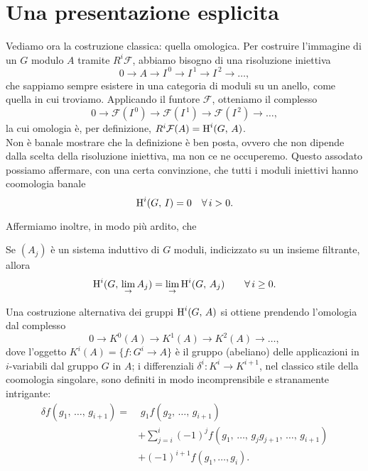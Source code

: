 \section{Una presentazione esplicita}

Vediamo ora la costruzione classica: quella omologica. Per costruire l'immagine di un $ G $ modulo $ A $ tramite $ R^i\mathcal{F} $, abbiamo bisogno di una risoluzione iniettiva
\[ 0 \to A \to I^{\,0} \to I^{\,1} \to I^{\,2} \to \dots, \]
che sappiamo sempre esistere in una categoria di moduli su un anello, come quella in cui troviamo. Applicando il funtore $ \mathcal{F} $, otteniamo il complesso
\[ 0 \to \mathcal{F}\left(I^{\,0}\right) \to \mathcal{F}\left(I^{\,1}\right) \to \mathcal{F}\left(I^{\,2}\right) \to \dots, \]
la cui omologia è, per definizione, $ R^i\mathcal{F}(A) = \operatorname{H}^i(G, \, A) $. \\

Non è banale mostrare che la definizione è ben posta, ovvero che non dipende dalla scelta della risoluzione iniettiva, ma non ce ne occuperemo. Questo assodato possiamo affermare, con una certa convinzione, che tutti i moduli iniettivi hanno coomologia banale
\begin{equation} \label{injban}
	\operatorname{H}^i(G, \, I) = 0 \quad \forall \, i > 0.
\end{equation} 

Affermiamo inoltre, in modo più ardito, che
\begin{proposition} 
	Se $ (A_j) $ è un sistema induttivo di $ G $ moduli, indicizzato su un insieme filtrante, allora
	\[ \operatorname{H}^i(G, \, \lim_\rightarrow A_j) = \lim_\rightarrow \operatorname{H}^i(G, \, A_j) \qquad \forall \, i \geq 0. \] 
\end{proposition}


Una costruzione alternativa dei gruppi $ \operatorname{H}^i(G, \, A) $ si ottiene prendendo l'omologia dal complesso
\[ 0 \to K^0(A) \to K^1(A) \to K^2 (A) \to \dots, \]
dove l'oggetto $ K^i(A) = \{ f \colon G^i \to A\} $ è il gruppo (abeliano) delle applicazioni in $ i $-variabili dal gruppo $ G $ in $ A $; i differenziali $ \delta^i \colon K^i \to K^{i+1} $, nel classico stile della coomologia singolare, sono definiti in modo incomprensibile e stranamente intrigante:
\begin{align*}
	\delta f(g_1, \, \dots, \, g_{i+1}) = & \;  g_1 f(g_2, \, \dots, \, g_{i+1}) \\ & + \sum_{j = i}^{i} (-1)^j f(g_1, \, \dots, \, g_jg_{j+1}, \, \dots, \, g_{i+1}) \\ & + (-1)^{i+1} f(g_1, \dots, g_i).
\end{align*}

